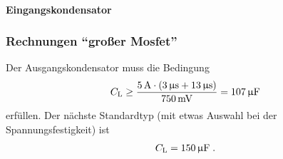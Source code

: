 \paragraph{Eingangskondensator}





\subsubsection{Rechnungen "`großer Mosfet"'}

Der Ausgangskondensator muss die Bedingung
\begin{align*}
	C_{\mathrm{L}} \geq \frac{5\,\mathrm{A} \cdot (3\,\mathrm{\upmu s} + 13\,\mathrm{\upmu s})}{750\,\mathrm{mV}} = 107\,\mathrm{\upmu F}
\end{align*}
erfüllen. Der nächste Standardtyp (mit etwas Auswahl bei der Spannungsfestigkeit) ist
\begin{align*}
	C_{\mathrm{L}} = 150\,\mathrm{\upmu F}\;.
\end{align*}




